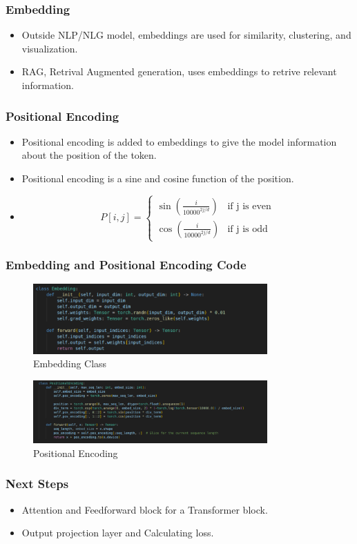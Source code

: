 \documentclass[
    10pt %
    16:9, %
]{beamer}
\begin{document}
\frame
{
  \frametitle{Embedding}
  \begin{itemize}
      \item Outside NLP/NLG model, embeddings are used for similarity, clustering, and visualization.
      \item RAG, Retrival Augmented generation, uses embeddings to retrive relevant information.
  \end{itemize}
}

\frame
{
  \frametitle{Positional Encoding}
  \begin{itemize}
      \item Positional encoding is added to embeddings to give the model information about the position of the token.
      \item Positional encoding is a sine and cosine function of the position.
      \item $$P[i, j] = \begin{cases}
        \sin\left(\frac{i}{10000^{2j/d}}\right) & \text{if j is even} \\
        \cos\left(\frac{i}{10000^{2j/d}}\right) & \text{if j is odd}
      \end{cases}$$
  \end{itemize}
}

\frame
{
  \frametitle{Embedding and Positional Encoding Code}
  \begin{figure}
    \centering
    \includegraphics[width=0.8\textwidth]{embedding_code.png}
    \caption{Embedding Class}
  \end{figure}
  \begin{figure}
    \centering
    \includegraphics[width=0.8\textwidth]{pos_code.png}
    \caption{Positional Encoding}
  \end{figure}
}

\frame
{
  \frametitle{Next Steps}
  \begin{itemize}
    \item Attention and Feedforward block for a Transformer block.
    \item Output projection layer and Calculating loss.
  \end{itemize}
}
\end{document}
